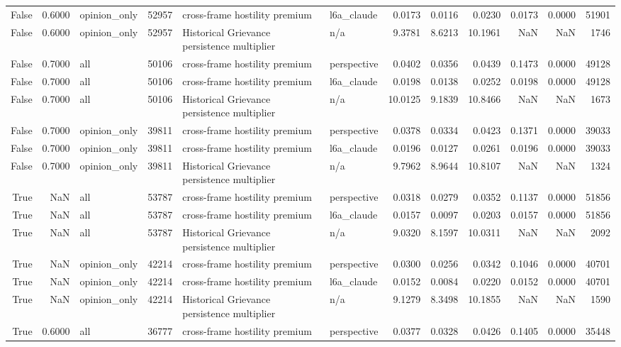\begin{longtable}{rrlrllrrrrrr}
False & 0.6000 & opinion\_only & 52957 & cross-frame hostility premium & l6a\_claude & 0.0173 & 0.0116 & 0.0230 & 0.0173 & 0.0000 & 51901 \\
False & 0.6000 & opinion\_only & 52957 & Historical Grievance persistence multiplier & n/a & 9.3781 & 8.6213 & 10.1961 & NaN & NaN & 1746 \\
False & 0.7000 & all & 50106 & cross-frame hostility premium & perspective & 0.0402 & 0.0356 & 0.0439 & 0.1473 & 0.0000 & 49128 \\
False & 0.7000 & all & 50106 & cross-frame hostility premium & l6a\_claude & 0.0198 & 0.0138 & 0.0252 & 0.0198 & 0.0000 & 49128 \\
False & 0.7000 & all & 50106 & Historical Grievance persistence multiplier & n/a & 10.0125 & 9.1839 & 10.8466 & NaN & NaN & 1673 \\
False & 0.7000 & opinion\_only & 39811 & cross-frame hostility premium & perspective & 0.0378 & 0.0334 & 0.0423 & 0.1371 & 0.0000 & 39033 \\
False & 0.7000 & opinion\_only & 39811 & cross-frame hostility premium & l6a\_claude & 0.0196 & 0.0127 & 0.0261 & 0.0196 & 0.0000 & 39033 \\
False & 0.7000 & opinion\_only & 39811 & Historical Grievance persistence multiplier & n/a & 9.7962 & 8.9644 & 10.8107 & NaN & NaN & 1324 \\
True & NaN & all & 53787 & cross-frame hostility premium & perspective & 0.0318 & 0.0279 & 0.0352 & 0.1137 & 0.0000 & 51856 \\
True & NaN & all & 53787 & cross-frame hostility premium & l6a\_claude & 0.0157 & 0.0097 & 0.0203 & 0.0157 & 0.0000 & 51856 \\
True & NaN & all & 53787 & Historical Grievance persistence multiplier & n/a & 9.0320 & 8.1597 & 10.0311 & NaN & NaN & 2092 \\
True & NaN & opinion\_only & 42214 & cross-frame hostility premium & perspective & 0.0300 & 0.0256 & 0.0342 & 0.1046 & 0.0000 & 40701 \\
True & NaN & opinion\_only & 42214 & cross-frame hostility premium & l6a\_claude & 0.0152 & 0.0084 & 0.0220 & 0.0152 & 0.0000 & 40701 \\
True & NaN & opinion\_only & 42214 & Historical Grievance persistence multiplier & n/a & 9.1279 & 8.3498 & 10.1855 & NaN & NaN & 1590 \\
True & 0.6000 & all & 36777 & cross-frame hostility premium & perspective & 0.0377 & 0.0328 & 0.0426 & 0.1405 & 0.0000 & 35448 \\

\end{longtable}
